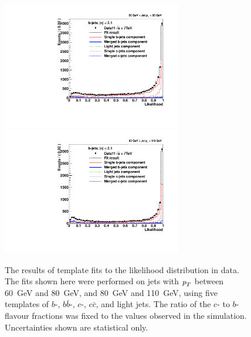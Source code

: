 \begin{figure}[tp]
\centering
\includegraphics[width=0.7\textwidth]{FIGS/Fits/LikelihoodFit_3param_ETAFull_Bin1.pdf}
\includegraphics[width=0.7\textwidth]{FIGS/Fits/LikelihoodFit_3param_ETAFull_Bin2.pdf}
\caption{The results of template fits to the likelihood distribution in data. The fits shown here were performed on jets with ${\emph{p}_{T}}$ between  60~GeV and 80~GeV, and 80~GeV and 110~GeV, using five templates of $b$-, $b\bar{b}$-, $c$-, $c\bar{c}$, and light jets.  The ratio of the $c$- to $b$-flavour fractions was fixed to the values observed in the simulation.  Uncertainties shown are statistical only.  }
\label{fig:fittemplates1}
\end{figure}



